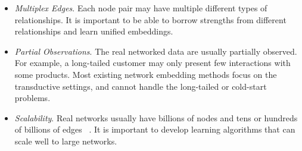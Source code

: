 \documentclass[sigconf]{acmart}
\begin{document}
\begin{itemize}[leftmargin=*]


	\item  \textit{Multiplex Edges}. Each node pair may have multiple different types of relationships.  It is important to be able to borrow strengths from different relationships and learn unified embeddings.

	\item  \textit{Partial Observations}. The real networked data are usually partially observed. For example, a long-tailed customer may only present few interactions with some products. Most existing network embedding methods  focus on the transductive settings, and cannot handle the long-tailed or cold-start problems.
	


	\item \textit{Scalability}. Real networks usually have billions of nodes and tens or hundreds of billions of edges ~\cite{wang2018billion}. It is important to develop learning algorithms that can scale well to large networks.
	
\end{itemize}
\end{document}
